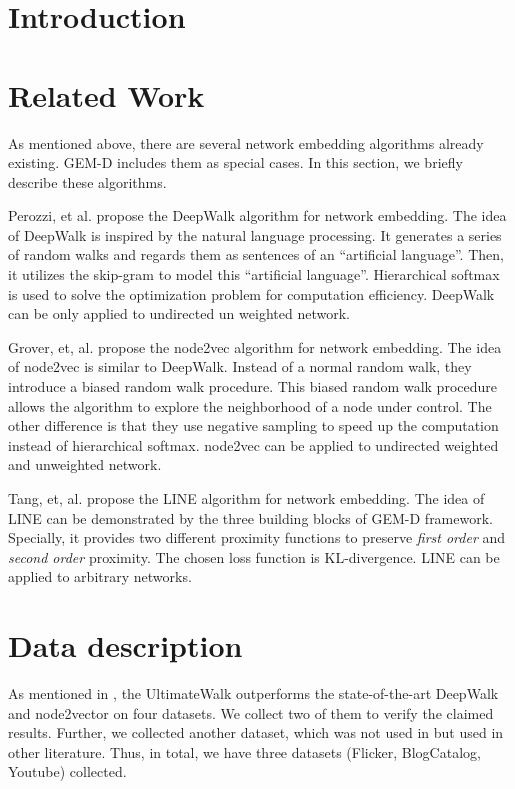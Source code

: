 \documentclass{sig-alternate-05-2015}
\begin{document}
\section{Introduction}

\section{Related Work}
As mentioned above, there are several network embedding algorithms already existing. GEM-D includes them as special cases. In this section, we briefly describe these algorithms.

Perozzi, et al. \cite{DBLP:conf/kdd/PerozziAS14} propose the DeepWalk algorithm for network embedding. The idea of DeepWalk is inspired by the natural language processing. It generates a series of random walks and regards them as sentences of an ``artificial language''. Then, it utilizes the skip-gram \cite{DBLP:journals/corr/abs-1301-3781} to model this ``artificial language''. Hierarchical softmax \cite{DBLP:conf/aistats/MorinB05} is used to solve the optimization problem for computation efficiency. DeepWalk can be only applied to undirected un weighted network.

Grover, et, al. \cite{DBLP:conf/kdd/GroverL16} propose the node2vec algorithm for network embedding. The idea of node2vec is similar to DeepWalk. Instead of a normal random walk, they introduce a biased random walk procedure. This biased random walk procedure allows the algorithm to explore the neighborhood of a node under control. The other difference is that they use negative sampling \cite{DBLP:conf/nips/MikolovSCCD13} to speed up the computation instead of hierarchical softmax. node2vec can be applied to undirected weighted and unweighted network.

Tang, et, al. \cite{DBLP:conf/www/TangQWZYM15} propose the LINE algorithm for network embedding. The idea of LINE can be demonstrated by the three building blocks of GEM-D framework. Specially, it provides two different proximity functions to preserve \emph{first order} and \emph{second order} proximity. The chosen loss function is KL-divergence. LINE can be applied to arbitrary networks.

\section{Data description}
As mentioned in \cite{DBLP:journals/corr/ChenNAKF17}, the UltimateWalk outperforms the state-of-the-art DeepWalk and node2vector on four datasets. We collect two of them to verify the claimed results. Further, we collected another dataset, which was not used in \cite{DBLP:journals/corr/ChenNAKF17} but used in other literature\cite{DBLP:conf/kdd/PerozziAS14}. Thus, in total, we have three datasets (Flicker, BlogCatalog, Youtube) collected.
\end{document}

